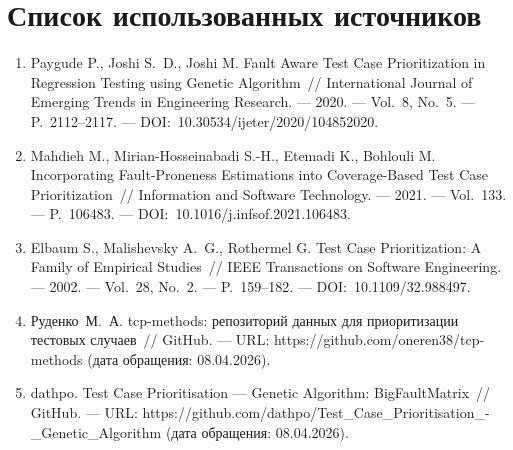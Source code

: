 \clearpage                                  %
\chapter*{Список использованных источников}	
\begin{enumerate}[1. ]
    \item Paygude P., Joshi S.~D., Joshi M. Fault Aware Test Case 
    Prioritization in Regression Testing using Genetic Algorithm~// 
    International Journal of Emerging Trends in Engineering Research. 
    --- 2020. --- Vol.~8, No.~5. --- P.~2112--2117. --- 
    DOI:~10.30534/ijeter/2020/104852020.

    \item Mahdieh M., Mirian-Hosseinabadi S.-H., Etemadi K., 
    Bohlouli M. Incorporating Fault-Proneness Estimations into 
    Coverage-Based Test Case Prioritization~// 
    Information and Software Technology. --- 2021. --- Vol.~133. --- 
    P.~106483. --- DOI:~10.1016/j.infsof.2021.106483.

    \item Elbaum S., Malishevsky A.~G., Rothermel G. Test Case 
    Prioritization: A Family of Empirical Studies~// 
    IEEE Transactions on Software Engineering. --- 2002. --- 
    Vol.~28, No.~2. --- P.~159--182. --- 
    DOI:~10.1109/32.988497.

    \item Руденко~М.~А. tcp-methods: репозиторий данных для 
    приоритизации тестовых случаев~// GitHub. --- URL: 
    https://github.com/oneren38/tcp-methods (дата обращения: 
    08.04.2026).

    \item dathpo. Test Case Prioritisation --- Genetic Algorithm: 
    BigFaultMatrix~// GitHub. --- URL: 
    https://github.com/dathpo/Test\_Case\_Prioritisation\_-\_Genetic\_Algorithm 
    (дата обращения: 08.04.2026).
\end{enumerate}


